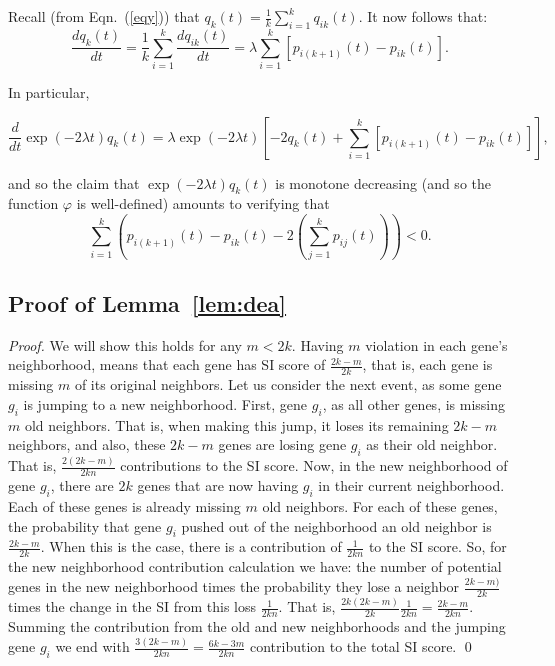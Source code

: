 \documentclass[runningheads, 11pt]{llncs}
\begin{document}
Recall (from Eqn.~(\ref{eqy})) that $q_k(t) = \frac{1}{k}\sum_{i=1}^k
q_{ik}(t)$. It now follows that: $$\frac{dq_{k}(t)}{dt} = \frac{1}{k}
\sum_{i=1}^k \frac{dq_{ik}(t)}{dt} =\lambda \sum_{i=1}^k
[p_{i(k+1)}(t)-p_{ik}(t)].$$

In particular,

$$\frac{d}{dt} \exp(-2\lambda t)q_k(t) = \lambda \exp(-2\lambda t)\left[-2q_k(t)
+ \sum_{i=1}^k [p_{i(k+1)}(t)-p_{ik}(t)]\right],$$

\noindent and so the claim that $\exp(-2\lambda t)q_k(t)$ is monotone decreasing
(and so the function $\varphi$ is well-defined) amounts to verifying that
\begin{equation}
\label{eqo}
\sum_{i=1}^k \left( p_{i(k+1)}(t)-p_{ik}(t) -2 \left( \sum_{j=1}^k p_{ij}(t)
\right)\right)<0.
\end{equation}

\subsection{Proof of Lemma~\ref{lem:dea}}\label{sec-append-lem}

\begin{proof}
We will show this holds for any $m<2k$. Having $m$ violation in each gene's
neighborhood, means that each gene has SI score of $\frac{2k-m}{2k}$, that is,
each gene is missing $m$ of its original neighbors. Let us consider the next
event, as some gene $g_i$ is jumping to a new neighborhood. First, gene $g_i$,
as all other genes, is missing $m$ old neighbors. That is, when making this
jump, it loses its remaining $2k-m$ neighbors, and also, these $2k-m$ genes are
losing gene $g_i$ as their old neighbor. That is, $\frac{2(2k-m)}{2kn}$
contributions to the SI score. Now, in the new neighborhood of gene $g_i$, there
are $2k$ genes that are now having $g_i$ in their current neighborhood. Each of
these genes is already missing $m$ old neighbors. For each of these genes, the
probability that gene $g_i$ pushed out of the neighborhood an old neighbor is
$\frac{2k-m}{2k}$. When this is the case, there is a contribution of
$\frac1{2kn}$ to the SI score. So, for the new neighborhood contribution
calculation we have: the number of potential genes in the new neighborhood times
the probability they lose a neighbor $\frac{2k-m)}{2k}$ times the change in the
SI from this loss $\frac{1}{2kn}$. That is, $\frac{2k(2k-m)}{2k }\frac{1}{2kn} =
\frac{2k-m}{2kn}$. Summing the contribution from the old and new neighborhoods
and the jumping gene $g_i$ we end with $\frac{3( 2k-m ) }{2kn} =
\frac{6k-3m}{2kn}$ contribution to the total SI score. \qed
\end{proof}
\clearpage
\end{document}
